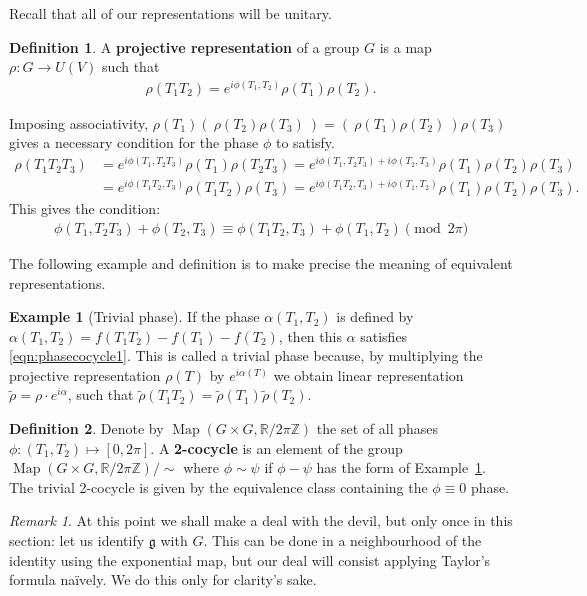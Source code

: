 \documentclass[10pt]{article}
\newcommand{\bZ}{\mathbb Z}
\newcommand{\bR}{\mathbb{R}}
\newcommand{\mf}{\mathfrak}
\theoremstyle{plain}
\theoremstyle{definition}
\newtheorem{defn}{Definition}
\newtheorem{example}{Example}
\theoremstyle{remark}
\newtheorem*{remark}{Remark}
\DeclareMathOperator{\Map}{Map}
\begin{document}
Recall that all of our representations will be unitary.
\begin{defn}
    A \textbf{projective representation} of a group $G$ is a map
    $\rho : G \to U(V)$ such that
    \begin{align}
        \rho(T_1T_2) = e^{i\phi(T_1,T_2)} \rho(T_1) \rho(T_2). 
        \label{eqn:projrep1}
    \end{align} 
\end{defn}
Imposing associativity, $\rho(T_1)(\ \rho(T_2)\rho(T_3)\ ) = (\
\rho(T_1)\rho(T_2)\ )\rho(T_3)$ gives a necessary condition for the
phase $\phi$ to satisfy.
\begin{align*}
    \rho(T_1T_2T_3)
    &= e^{i\phi(T_1,T_2T_3)}\rho(T_1)\rho(T_2T_3)
     = e^{i\phi(T_1,T_2T_3)+i\phi(T_2,T_3)}\rho(T_1)\rho(T_2)\rho(T_3)\\
    &= e^{i\phi(T_1T_2,T_3)}\rho(T_1T_2)\rho(T_3)
     = e^{i\phi(T_1T_2,T_3)+i\phi(T_1,T_2)}\rho(T_1)\rho(T_2)\rho(T_3).
\end{align*}
This gives the condition:
\begin{align}
    \phi(T_1,T_2T_3) + \phi(T_2,T_3) \equiv
    \phi(T_1T_2,T_3)+\phi(T_1,T_2) \pmod{2\pi}
    \label{eqn:phasecocycle1}
\end{align}

The following example and definition is to make precise the meaning of
equivalent representations.
\begin{example}[Trivial phase] \label{example:trivialphase1}
    If the phase $\alpha(T_1,T_2)$ is defined by $\alpha(T_1,T_2) =
    f(T_1T_2) - f(T_1) - f(T_2)$, then this $\alpha$ satisfies
    \eqref{eqn:phasecocycle1}. This is called a trivial phase because,
    by multiplying the projective representation $\rho(T)$ by
    $e^{i\alpha(T)}$ we obtain linear representation $\tilde\rho =
    \rho\cdot e^{i\alpha}$, such that $\tilde\rho(T_1T_2) =
    \tilde\rho(T_1)\tilde\rho(T_2)$.
\end{example}
%
\begin{defn}
    Denote by $\Map(G\times G,\bR/2\pi\bZ)$ the set of all phases
    $\phi:(T_1,T_2)\mapsto [0,2\pi]$. 
    A \textbf{2-cocycle} is an element of the group $\Map(G\times
    G,\bR/2\pi\bZ)/\sim$ where $\phi \sim \psi$ if $\phi-\psi$
    has the form of Example~\ref{example:trivialphase1}.
    The trivial 2-cocycle is given by the equivalence class containing
    the $\phi\equiv0$ phase. 
\end{defn}

\begin{remark}
    At this point we shall make a deal with the devil, but only once
    in this section: let us identify $\mf g$ with $G$. This can be
    done in a neighbourhood of the identity using the exponential
    map, but our deal will consist applying Taylor's formula
    na\"ively. We do this only for clarity's sake.
\end{remark}
\end{document}
